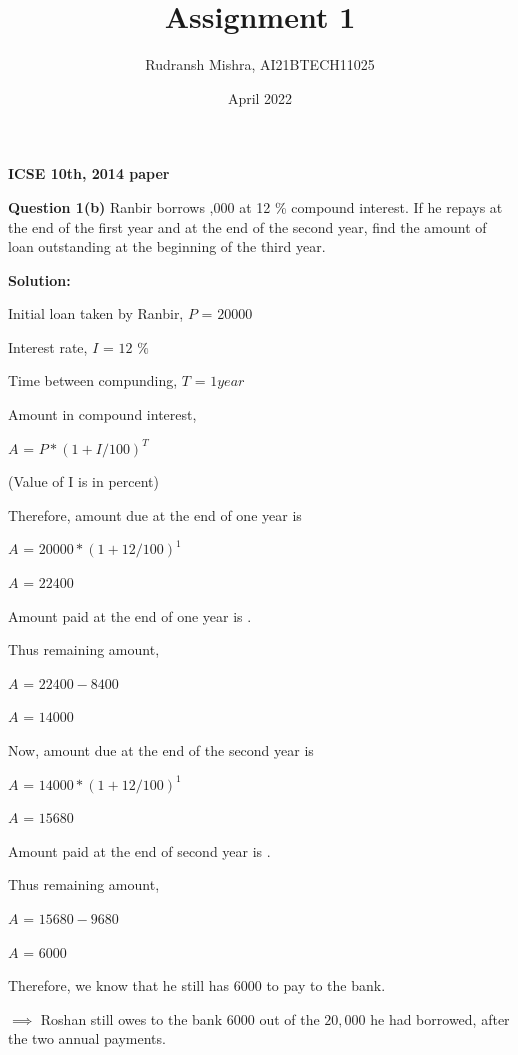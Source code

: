 \documentclass[article,12pt,twocolumn]{IEEEtran}
\begin{document}
 

\title{Assignment 1}
\author{Rudransh Mishra, AI21BTECH11025}
\date{April 2022}
\maketitle

\textbf{ICSE 10th, 2014 paper}


\hfill

\textbf{Question 1(b)} 
Ranbir borrows ,000 at 12 \% compound interest. If he repays  at the end of the first year and  at the end of the second year, find the amount of loan outstanding at the beginning of the third year.

\hfill \break
\textbf{Solution:}

Initial loan taken by Ranbir, $P$ = \rupee $20000$

Interest rate, $I$ = $12 $ $\%$

Time between compunding, $T$ = $1 year $

\hfill

Amount in compound interest, 

\hfill

$A$ = $ P * (1+I/100)^T $ 

\hfill

(Value of I is in percent)

\hfill

Therefore, amount due at the end of one year is 

\hfill

$A$ = $20000 * (1+12/100)^1 $

$A$ = \rupee $22400$

\hfill

Amount paid at the end of one year is .

Thus remaining amount,

\hfill

$A$ = $22400-8400$

$A$ = \rupee $14000$

\hfill

Now, amount due at the end of the second year is 

\hfill

$A$ = $14000 * (1+12/100)^1 $

$A$ = \rupee $15680$

\hfill

Amount paid at the end of second year is .


Thus remaining amount,

\hfill

$A$ = $15680-9680$

$A$ = \rupee $6000$

\hfill

\hfill

\hfill

\hfill

Therefore, we know that he still has \rupee $6000$ to pay to the bank.

\hfill

$\implies$ Roshan still owes to the bank \rupee $6000$ out of the \rupee $20,000$ he had borrowed, after the two annual payments.
\end{document}

